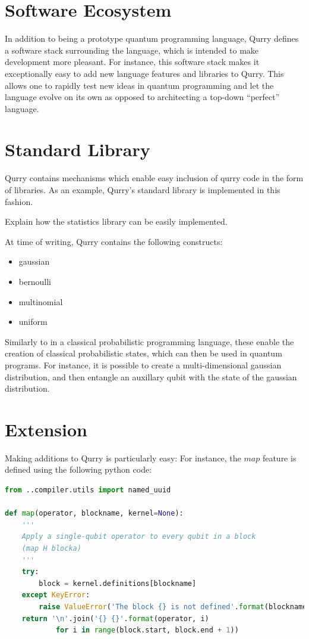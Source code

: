 \documentclass[a4paper,twocolumn,11pt,accepted=2017-05-09]{quantumarticle}
\begin{document}
\section{Software Ecosystem}

In addition to being a prototype quantum programming language, Qurry defines a software stack surrounding the language, which is intended to make development more pleasant.
For instance, this software stack makes it exceptionally easy to add new language features and libraries to Qurry.
This allows one to rapidly test new ideas in quantum programming and let the language evolve on its own as opposed to architecting a top-down ``perfect'' language.

\section{Standard Library}

    Qurry contains mechanisms which enable easy inclusion of qurry code in the form of libraries.
    As an example, Qurry's standard library is implemented in this fashion.

    Explain how the statistics library can be easily implemented.

    At time of writing, Qurry contains the following constructs:  	
    \begin{itemize}
	    \item gaussian 	
        \item bernoulli
	    \item multinomial 	
	    \item uniform
    \end{itemize}

    Similarly to in a classical probabilistic programming language, these enable the creation of classical probabilistic states, which can then be used in quantum programs.
    For instance, it is possible to create a multi-dimensional gaussian distribution, and then entangle an auxillary qubit with the state of the gaussian distribution.

    \section{Extension}

    Making additions to Qurry is particularly easy:
    For instance, the $map$ feature is defined using the following python code:

    \begin{lstlisting}[language=Python]
from ..compiler.utils import named_uuid

def map(operator, blockname, kernel=None):
    '''
    Apply a single-qubit operator to every qubit in a block
    (map H blocka)
    '''
    try:
        block = kernel.definitions[blockname]
    except KeyError:
        raise ValueError('The block {} is not defined'.format(blockname))
    return '\n'.join('{} {}'.format(operator, i)
            for i in range(block.start, block.end + 1))
    \end{lstlisting}
\end{document}
